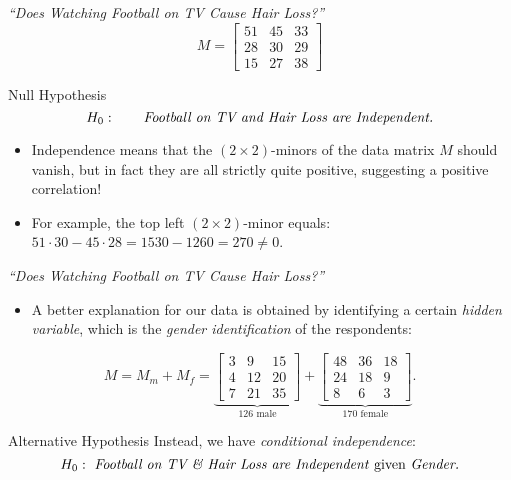 \begin{frame}{\emph{``Does Watching Football on TV Cause Hair Loss?''}}
    $$ M = \begin{bmatrix} 
    51 & 45 & 33 \\ 
    28 & 30 & 29 \\ 
    15 & 27 & 38
    \end{bmatrix} $$

    \begin{block}{Null Hypothesis}
    \vspace*{-18pt}
        \begin{equation*}
            H_{0}: \qquad \text{\emph{Football on TV and Hair Loss are Independent.}}
        \end{equation*}
    \vspace*{-18pt}
    \end{block}

    \begin{itemize}
        \item Independence means that the $(2 \times 2)$-minors of the data matrix $M$ should vanish, but in fact they are all strictly quite positive, suggesting a positive correlation!
        \item For example, the top left $(2 \times 2)$-minor equals: $51 \cdot 30 - 45 \cdot 28 = 1530 - 1260 = 270 \neq 0$.
    \end{itemize}

\end{frame}

\begin{frame}{\emph{``Does Watching Football on TV Cause Hair Loss?''}}

    \begin{itemize}
        \item A better explanation for our data is obtained by identifying a certain \emph{hidden variable}, which is the \emph{gender identification} of the respondents:
    \end{itemize}

    $$ M  = M_{m} + M_{f} = 
    \underbrace{\begin{bmatrix} 
    3 & 9 & 15 \\ 
    4 & 12 & 20 \\ 
    7 & 21 & 35
    \end{bmatrix}}_{126 \text{ male}} + 
    \underbrace{\begin{bmatrix} 
    48 & 36 & 18 \\
    24 & 18 & 9 \\
    8 & 6 & 3
    \end{bmatrix}}_{170 \text{ female}}.  $$

    \begin{block}{Alternative Hypothesis}
        Instead, we have \emph{conditional independence}:
        \begin{equation*}
            H_{0}: \text{ \emph{Football on TV \& Hair Loss are Independent} given \emph{Gender.}}
        \end{equation*}
    \end{block}

\end{frame}

